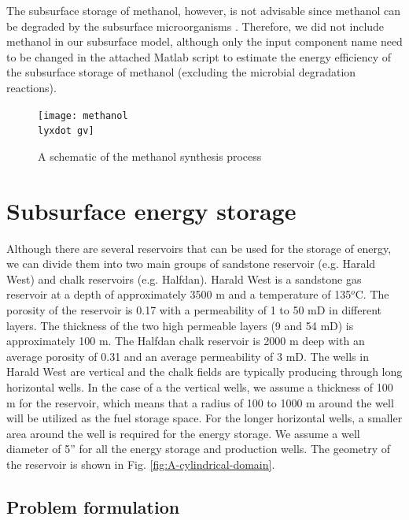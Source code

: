\documentclass{ECOS_2021}
\begin{document}
The subsurface storage of methanol, however, is not advisable since
methanol can be degraded by the subsurface microorganisms \cite{sousaDeepsubsurfaceSulfateReducer2018}.
Therefore, we did not include methanol in our subsurface model, although
only the input component name need to be changed in the attached Matlab
script to estimate the energy efficiency of the subsurface storage
of methanol (excluding the microbial degradation reactions). 

\begin{figure}[H]
\texttt{[image: methanol\\lyxdot gv]}

\caption{A schematic of the methanol synthesis process \cite{eftekhariQuantifyingRoleLiquid2020}}
\end{figure}


\sffamily \Large \section{Subsurface energy storage}
\rmfamily \normalsize
Although there are several reservoirs that can be used for the storage
of energy, we can divide them into two main groups of sandstone reservoir
(e.g. Harald West) and chalk reservoirs (e.g. Halfdan). Harald West
is a sandstone gas reservoir at a depth of approximately 3500 m and
a temperature of 135$^{o}$C. The porosity of the reservoir is 0.17
with a permeability of 1 to 50 mD in different layers. The thickness
of the two high permeable layers (9 and 54 mD) is approximately 100
m. The Halfdan chalk reservoir is 2000 m deep with an average porosity
of 0.31 and an average permeability of 3 mD. The wells in Harald West
are vertical and the chalk fields are typically producing through
long horizontal wells. In the case of a the vertical wells, we assume
a thickness of 100 m for the reservoir, which means that a radius
of 100 to 1000 m around the well will be utilized as the fuel storage
space. For the longer horizontal wells, a smaller area around the
well is required for the energy storage. We assume a well diameter
of 5'' for all the energy storage and production wells. The geometry
of the reservoir is shown in Fig. \ref{fig:A-cylindrical-domain}. 

\subsection{Problem formulation}
\end{document}

